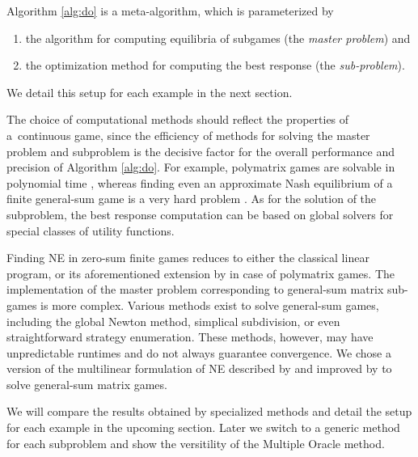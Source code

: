Algorithm \ref{alg:do} is a meta-algorithm, which is parameterized by
\begin{enumerate}
	\item the algorithm for computing equilibria of subgames (the \emph{master problem}) and
	\item the optimization method for computing the best response (the \emph{sub-problem}).
\end{enumerate}
We detail this setup for each example in the next section.


The choice of computational methods should reflect the properties of a~continuous game, since the efficiency of methods for solving the master problem and subproblem is the decisive factor for the overall performance and precision of Algorithm \ref{alg:do}. For example, polymatrix games are solvable in polynomial time \cite{Cai16}, whereas finding even an approximate Nash equilibrium of a finite general-sum game is a very hard problem \cite{Daskalakis09}. As for the solution of the subproblem, the best response computation can be based on global solvers for special classes of utility functions.


Finding NE in zero-sum finite games reduces to either the classical linear program, or its aforementioned extension by \textcite{Cai16} in case of polymatrix games. The implementation of the master problem corresponding to general-sum matrix sub-games is more complex. Various methods exist to solve general-sum games, including the global Newton method, simplical subdivision, or even straightforward strategy enumeration. These methods, however, may have unpredictable runtimes and do not always guarantee convergence. We chose a version of the multilinear formulation of NE described by \textcite{sturmfels} and improved by \textcite{multilinear} to solve general-sum matrix games.

We will compare the results obtained by specialized methods and detail the setup for each example in the upcoming section. Later we switch to a generic method for each subproblem and show the versitility of the Multiple Oracle method.